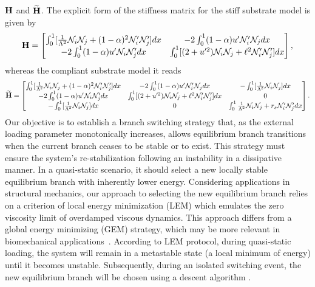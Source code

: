 $\mathbf{H}$ and $\widetilde{\mathbf{H}}$. The explicit form of the stiffness matrix for the stiff substrate model is given by
\begin{equation}
    \mathbf{H} = 
    \begin{bmatrix}
\int_0^1[ \frac{1}{\Lambda^2}{\mathcal N}_i{\mathcal N}_j + (1-\alpha)^2{\mathcal N}'_i{\mathcal N}'_j
] dx&
-2\int_0^1(1-\alpha)u' {\mathcal N}'_i {\mathcal N}_j  dx\\
-2\int_0^1(1-\alpha)u' {\mathcal N}_i {\mathcal N}'_j dx
& \int_0^1 [ (2+u'^2){\mathcal N}_i{\mathcal N}_j +\ell^2{\mathcal N}'_i{\mathcal N}'_j] dx
\end{bmatrix},
\label{eq:stifness1}
\end{equation}
whereas the compliant substrate model it reads
\begin{equation}
    \widetilde{\mathbf{H}}=
    \begin{bmatrix}
    \int_0^1[ \frac{1}{\Lambda^2}{\mathcal N}_i{\mathcal N}_j + (1-\alpha)^2{\mathcal N}'_i{\mathcal N}'_j] dx&
-2\int_0^1(1-\alpha)u' {\mathcal N}'_i {\mathcal N}_j  dx&
-\int_0^1[\frac{1}{\Lambda^2}{\mathcal N}_i {\mathcal N}_j]  dx\\

-2\int_0^1(1-\alpha)u' {\mathcal N}_i {\mathcal N}'_j dx&
 \int_0^1 [ (2+u'^2){\mathcal N}_i{\mathcal N}_j +\ell^2{\mathcal N}'_i{\mathcal N}'_j] dx&
 0\\

-\int_0^1[\frac{1}{\Lambda^2}{\mathcal N}_i{\mathcal N}_j ] dx
&0
&\int_0^1\frac{1}{\Lambda^2}{\mathcal N}_i {\mathcal N}_j+r_s{\mathcal N}'_i {\mathcal N}'_j  dx
\end{bmatrix}.
\label{eq:stifness2}
\end{equation}
Our objective is to establish a branch switching strategy that,
as the external loading parameter monotonically increases, allows equilibrium branch transitions when the current branch ceases to be stable or to exist.
This strategy must ensure the system's re-stabilization following an instability in a dissipative manner. In a quasi-static scenario, it should select a new locally stable equilibrium branch with inherently lower energy.  Considering applications in structural mechanics, our approach to selecting the new equilibrium branch relies on a criterion of local energy minimization (LEM) which emulates the zero viscosity limit of overdamped viscous dynamics. This approach differs from a global energy minimizing (GEM) strategy, which may be more relevant in biomechanical applications~\cite{Salman2021-mn}. According to LEM protocol, during quasi-static loading, the system will remain in a metastable state (a local minimum of energy) until it becomes unstable. Subsequently, during an isolated switching event, the new equilibrium branch will be chosen using a descent algorithm \cite{Puglisi2005-lg}.

